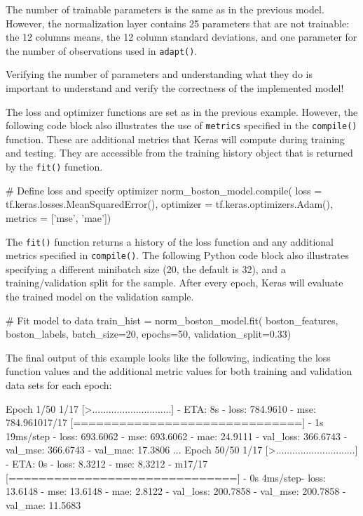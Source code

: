 \begin{withcode}
The number of trainable parameters is the same as in the previous model. However, the normalization layer contains 25 parameters that are not trainable: the 12 columns means, the 12 column standard deviations, and one parameter for the number of observations used in \texttt{adapt()}. 

\begin{alertbox}
Verifying the number of parameters and understanding what they do is important to understand and verify the correctness of the implemented model!
\end{alertbox}

The loss and optimizer functions are set as in the previous example. However, the following code block also illustrates the use of \texttt{metrics} specified in the \texttt{compile()} function. These are additional metrics that Keras will compute during training and testing. They are accessible from the training history object that is returned by the \texttt{fit()} function.

\begin{pythoncode}
# Define loss and specify optimizer
norm_boston_model.compile(
    loss = tf.keras.losses.MeanSquaredError(),
    optimizer = tf.keras.optimizers.Adam(),
    metrics = ['mse', 'mae'])
\end{pythoncode}

\noindent The \texttt{fit()} function returns a history of the loss function and any additional metrics specified in \texttt{compile()}. The following Python code block also illustrates specifying a different minibatch size (20, the default is 32), and a training/validation split for the sample. After every epoch, Keras will evaluate the trained model on the validation sample. 

\begin{pythoncode} 
# Fit model to data
train_hist = norm_boston_model.fit(
                    boston_features, 
                    boston_labels, 
                    batch_size=20,
                    epochs=50,
                    validation_split=0.33)
\end{pythoncode}

The final output of this example looks like the following, indicating the loss function values and the additional metric values for both training and validation data sets for each epoch:

\begin{textcode}
Epoch 1/50
 1/17 [>.............................] - ETA: 8s - loss: 784.9610 - 
 mse: 784.961017/17 [==============================] - 1s 19ms/step - 
 loss: 693.6062 - mse: 693.6062 - mae: 24.9111 - val_loss: 366.6743 - 
 val_mse: 366.6743 - val_mae: 17.3806
...
Epoch 50/50
 1/17 [>.............................] - ETA: 0s - loss: 8.3212 - 
 mse: 8.3212 - m17/17 [==============================] - 0s 4ms/step- 
 loss: 13.6148 - mse: 13.6148 - mae: 2.8122 - val_loss: 200.7858 - 
 val_mse: 200.7858 - val_mae: 11.5683
\end{textcode}


\end{withcode}
